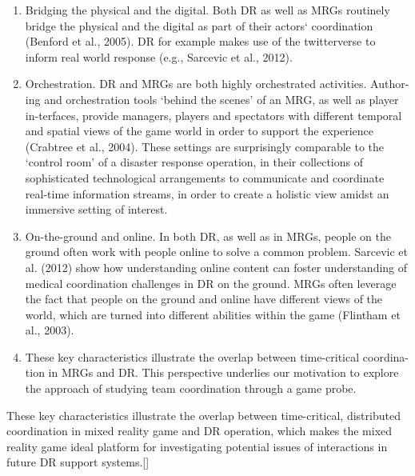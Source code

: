 \begin{enumerate}
\item Bridging the physical and the digital. Both DR as well as MRGs routinely bridge the physical and the digital as part of their actors` coordination (Benford et al., 2005). DR for example makes use of the twitterverse to inform real world response (e.g., Sarcevic et al., 2012).

\item Orchestration. DR and MRGs are both highly orchestrated activities. Author-ing and orchestration tools `behind the scenes' of an MRG, as well as player in-terfaces, provide managers, players and spectators with different temporal and spatial views of the game world in order to support the experience (Crabtree et al., 2004). These settings are surprisingly comparable to the `control room' of a disaster response operation, in their collections of sophisticated technological arrangements to communicate and coordinate real-time information streams, in order to create a holistic view amidst an immersive setting of interest.\\

\item On-the-ground and online. In both DR, as well as in MRGs, people on the ground often work with people online to solve a common problem. Sarcevic et al. (2012) show how understanding online content can foster understanding of medical coordination challenges in DR on the ground. MRGs often leverage the fact that people on the ground and online have different views of the world, which are turned into different abilities within the game (Flintham et al., 2003).\\ 

\item These key characteristics illustrate the overlap between time-critical coordina-tion in MRGs and DR. This perspective underlies our motivation to explore the approach of studying team coordination through a game probe.\\

\end{enumerate}

These key characteristics illustrate the overlap between time-critical, distributed coordination in mixed reality game and DR operation, which makes the mixed reality game ideal platform for investigating potential issues of interactions in future DR support systems.[]\\



